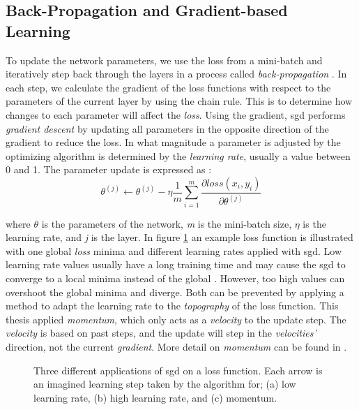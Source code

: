 \subsection{Back-Propagation and Gradient-based Learning}\label{backpropagation}
    To update the network parameters, we use the loss from a mini-batch and iteratively step back through the layers in a process called \textit{back-propagation} \cite{rumelhart1986learning_backprop}. In each step, we calculate the gradient of the loss functions with respect to the parameters of the current layer by using the chain rule. This is to determine how changes to each parameter will affect the \textit{loss}. Using the gradient, \gls{sgd} performs \textit{gradient descent} \cite{Goodfellow-et-al-2016} by updating all parameters in the opposite direction of the gradient to reduce the loss. In what magnitude a parameter is adjusted by the optimizing algorithm is determined by the \textit{learning rate}, usually a value between 0 and 1. The parameter update is expressed as \cite{pmlr-v37-ioffe15_batch_norm}:
    \begin{equation}
    \theta^{(j)} \leftarrow \theta^{(j)} - \eta \dfrac{1}{m}\sum_{i=1}^{m} \dfrac{\partial loss (x_i,y_i)}{\partial \theta^{(j)}}
    \end{equation}
    
    where $\theta$ is the parameters of the network, \textit{m} is the mini-batch size, $\eta$ is the learning rate, and \textit{j} is the layer. In figure \ref{learning_rates} an example loss function is illustrated with one global \textit{loss} minima and different learning rates applied with \gls{sgd}. Low learning rate values usually have a long training time and may cause the \gls{sgd} to converge to a local minima instead of the global \cite{farsal2018deep}. However, too high values can overshoot the global minima and diverge. Both can be prevented by applying a method to adapt the learning rate to the \textit{topography} of the loss function. This thesis applied \textit{momentum}, which only acts as a \textit{velocity} to the update step. The \textit{velocity} is based on past steps, and the update will step in the \textit{velocities'} direction, not the current \textit{gradient}. More detail on \textit{momentum} can be found in \citeauthor{pmlr-v28-sutskever13} \cite{pmlr-v28-sutskever13}.
    
    \begin{figure}[H]
        \centering

        
        \caption[Learning rates]{Three different applications of \gls{sgd} on a loss function. Each arrow is an imagined learning step taken by the algorithm for; (a) low learning rate, (b) high learning rate, and (c) momentum.}
      	\medskip 
        \label{learning_rates}
    \end{figure}

